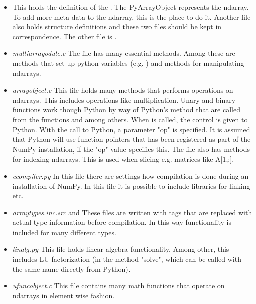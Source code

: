 \begin{itemize}
 \item{ This holds the definition of the
 . The PyArrayObject represents the ndarray. To add more
 meta data to the ndarray, this is the place to do it. Another file
 also holds structure definitions and these two files should be kept
 in correspondence. The other file is .}

 \item{\textit{multiarrayodule.c} The file has many essential methods. Among
 these are methods that set up python variables
 (e.g. ) and methods for manipulating
 ndarrays.}

 \item{\textit{arrayobject.c} This file holds many methods that
performs operations on ndarrays. This includes operations like
multiplication. Unary and binary functions work though Python by way
of Python's  method that are called from
the functions \linebreak[5] 
and  among others. When
\linebreak[5]  is called, the control is given to Python. With the
call to Python, a parameter "op" is specified. It is assumed that
Python will use function pointers that has been registered as part of
the NumPy installation, if the "op" value specifies this. The file
also has methods for indexing ndarrays. This is used when slicing
e.g. matrices like A[1,:].}

 \item{\textit{ccompiler.py} In this file there are settings how
 compilation is done during an installation of NumPy. In this file it
 is possible to include libraries for linking etc.}

 \item{\textit{arraytypes.inc.src} and 
 These files are written with tags that are replaced with actual
 type-information before compilation. In this way functionality is
 included for many different types.}

 \item{\textit{linalg.py} This file holds linear algebra functionality. Among
 other, this includes LU factorization (in the method "solve", which
 can be called with the same name directly from Python).}

 \item{\textit{ufuncobject.c} This file contains many math functions that
 operate on ndarrays in element wise fashion.}


\end{itemize}
